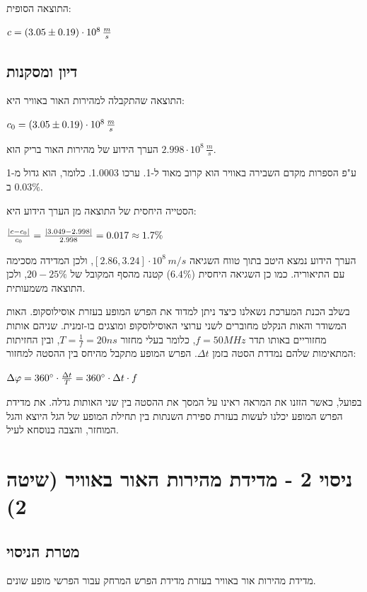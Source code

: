 \documentclass[14pt]{extarticle}
\makeatletter
\newenvironment{lefteqs}{%
    \begin{english}%
    \begin{flushleft}%
    \renewcommand{\arraystretch}{1.3}%
    $\begin{array}{@{}l@{}}%
}{%
    \end{array}$%
    \end{flushleft}%
    \end{english}%
}
\makeatother
\begin{document}
התוצאה הסופית:
\begin{lefteqs}
    c = (3.05 \pm 0.19) \cdot 10^8\,\frac{m}{s}
\end{lefteqs}

\subsection*{דיון ומסקנות}

התוצאה שהתקבלה למהירות האור באוויר היא:
\begin{lefteqs}
    c_0 = (3.05 \pm 0.19) \cdot 10^8\,\frac{m}{s}
\end{lefteqs}

הערך הידוע של מהירות האור בריק הוא $2.998 \cdot 10^8\,\frac{m}{s}$.

ע"פ הספרות מקדם השבירה באוויר הוא קרוב מאוד ל-1. ערכו 1.0003.
כלומר, הוא גדול מ-1 ב $0.03\%$.

הסטייה היחסית של התוצאה מן הערך הידוע היא:
\begin{lefteqs}
    \frac{\left|c - c_0\right|}{c_0} = \frac{\left|3.049 - 2.998\right|}{2.998} = 0.017 \approx 1.7\%
\end{lefteqs}

הערך הידוע נמצא היטב בתוך טווח השגיאה $[2.86, 3.24] \cdot 10^8\,m/s$, ולכן המדידה מסכימה עם התיאוריה.
כמו כן השגיאה היחסית ($6.4\%$) קטנה מהסף המקובל של $20-25\%$, ולכן התוצאה משמעותית.

בשלב הכנת המערכת נשאלנו כיצד ניתן למדוד את הפרש המופע
בעזרת אוסילוסקופ. האות המשודר והאות הנקלט מחוברים לשני ערוצי האוסילוסקופ ומוצגים בו-זמנית.
שניהם אותות מחזוריים באותו תדר $f = 50MHz$, כלומר בעלי מחזור $T = \frac{1}{f} = 20ns$,
ובין החזיתות המתאימות שלהם נמדדת הסטה בזמן $\Delta t$. הפרש המופע מתקבל מהיחס בין ההסטה למחזור:
\begin{lefteqs}
    \Delta \varphi = 360^\circ \cdot \frac{\Delta t}{T} = 360^\circ \cdot \Delta t \cdot f
\end{lefteqs}
בפועל, כאשר הזזנו את המראה ראינו על המסך את ההסטה בין שני האותות גדלה.
את מדידת הפרש המופע יכלנו לעשות בעזרת ספירת השנתות בין תחילת המופע של הגל היוצא והגל המוחזר, והצבה בנוסחא לעיל.

\newpage
\section*{ניסוי 2 - מדידת מהירות האור באוויר (שיטה 2)}

\subsection*{מטרת הניסוי}
מדידת מהירות אור באוויר בעזרת מדידת הפרש המרחק עבור הפרשי מופע שונים.
\end{document}
